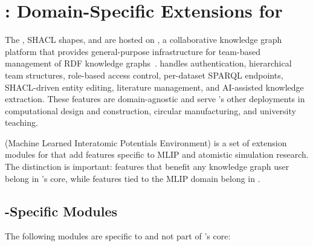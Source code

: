 \section{\MLIPE{}: Domain-Specific Extensions for \Concon{}}
\label{sec:mlipe}

The \MLIPsOntology{}, SHACL shapes, and \MLIPsKG{} are hosted on \Concon{}, a
collaborative knowledge graph platform that provides general-purpose
infrastructure for team-based management of RDF knowledge
graphs~\cite{hernandez2026concon}. \Concon{} handles authentication,
hierarchical team structures, role-based access control, per-dataset SPARQL
endpoints, SHACL-driven entity editing, literature management, and AI-assisted
knowledge extraction. These features are domain-agnostic and serve
\Concon{}'s other deployments in computational design and construction,
circular manufacturing, and university teaching.

\MLIPE{} (Machine Learned Interatomic Potentials Environment) is a set of
extension modules for \Concon{} that add features specific to MLIP and
atomistic simulation research. The distinction is important: features that
benefit any knowledge graph user belong in \Concon{}'s core, while features
tied to the MLIP domain belong in \MLIPE{}.

\subsection{\MLIPE{}-Specific Modules}

The following modules are specific to \MLIPE{} and not part of
\Concon{}'s core:

